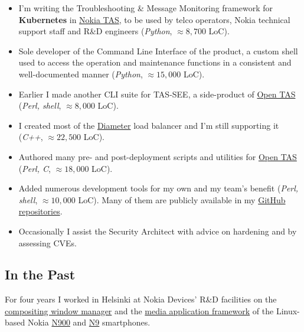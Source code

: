 \documentclass[a4paper,12pt]{article}
\newcommand\Yell{\textbf}
\newcommand{\compress}{\setlength\itemsep{-\parskip}}
\newenvironment{compressedItemize}{\begin{itemize}\compress}{\end{itemize}}
\begin{document}
\begin{compressedItemize}
\item	I'm writing the Troubleshooting \& Message Monitoring framework for
	\Yell{Kubernetes} in \hyperlink{TAS}{Nokia TAS}, to be used by telco
	operators, Nokia technical support staff and R\&D engineers
	(\textit{Python}, $\approx 8{,}700$ LoC).
\item	Sole developer of the Command Line Interface of the product,
	a custom shell used to access the operation and maintenance
	functions in a consistent and well-documented manner
	(\textit{Python}, $\approx 15{,}000$ LoC).
\item	Earlier I made another CLI suite for TAS-SEE, a side-product of
	\hyperlink{TAS}{Open TAS} (\textit{Perl, shell}, $\approx 8{,}000$ LoC).
\item	I created most of the \href{http://tools.ietf.org/html/rfc6733}{Diameter}
	load balancer and I'm still supporting it
	(\textit{C++}, $\approx 22{,}500$ LoC).
\item	Authored many pre- and post-deployment scripts and utilities for
	\hyperlink{TAS}{Open TAS} (\textit{Perl, C}, $\approx 18{,}000$ LoC).
\item	Added numerous development tools for my own and my team's benefit
	(\textit{Perl, shell}, $\approx 10{,}000$ LoC).  Many of them are
	publicly available in my \href{https://github.com/enadam?tab=repositories}%
	{GitHub repositories}.
\item	Occasionally I assist the Security Architect with advice on hardening
	and by assessing CVEs.
\end{compressedItemize}

\subsection*{In the Past}

For four years I worked in Helsinki at \hypertarget{gadgets}{Nokia Devices'
R\&D facilities} on the
\href{https://wiki.maemo.org/Documentation/Maemo_5_Developer_Guide/Architecture/UI_Framework#hildon-desktop}{compositing window manager} and the
\href{https://wiki.maemo.org/Documentation/Maemo_5_Developer_Guide/Using_Multimedia_Components/Media_Application_Framework_(MAFW)}{media application framework}
of the Linux-based Nokia \href{http://maemo.org/intro/maemo_history}{N900}
and \href{https://en.wikipedia.org/wiki/Nokia_N9}{N9} smartphones.
\end{document}
